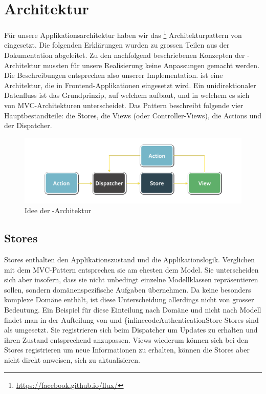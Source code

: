 \label{pd-architektur}
\section{Architektur}
Für unsere Applikationsarchitektur haben wir das \footnote{\url{https://facebook.github.io/flux/}} Architekturpattern von  eingesetzt.\newline
Die folgenden Erklärungen wurden zu grossen Teilen aus der  Dokumentation\cite{flux-docs-overview} abgeleitet.
Zu den nachfolgend beschriebenen Konzepten der -Architektur mussten für unsere Realisierung keine Anpassungen gemacht werden.
Die Beschreibungen entsprechen also unserer Implementation.\newline
{} ist eine Architektur, die in \gls{Frontend}-Applikationen eingesetzt wird.
Ein unidirektionaler Datenfluss ist das Grundprinzip, auf welchem  aufbaut, und in welchem es sich von \gls{MVC}-Architekturen unterscheidet.
Das Pattern beschreibt folgende vier Hauptbestandteile: die Stores, die Views (oder Controller-Views), die Actions und der Dispatcher.
\begin{figure}[H]
 	\centering
 	\includegraphics[width=\textwidth]{images/projektdokumentation/flux-uebersicht-weiss.png}
 	\caption{Idee der -Architektur}
 	\label{image-flux-overview-simple}
\end{figure}
\subsection{Stores}
\label{pd-flux-stores}
Stores enthalten den Applikationszustand und die Applikationslogik.
Verglichen mit dem \gls{MVC}-Pattern entsprechen sie am ehesten dem Model.
Sie unterscheiden sich aber insofern, dass sie nicht unbedingt einzelne Modellklassen repräsentieren sollen, sondern domänenspezifische Aufgaben übernehmen.
Da \kort{} keine besonders komplexe Domäne enthält, ist diese Unterscheidung allerdings nicht von grosser Bedeutung.
Ein Beispiel für diese Einteilung nach Domäne und nicht nach Modell findet man in der Aufteilung von  und \{inlinecode{AuthenticationStore}\newline
Stores sind als  umgesetzt.
Sie registrieren sich beim Dispatcher um Updates zu erhalten und ihren Zustand entsprechend anzupassen.
Views wiederum können sich bei den Stores registrieren um neue Informationen zu erhalten, können die Stores aber nicht direkt anweisen, sich zu aktualisieren.

